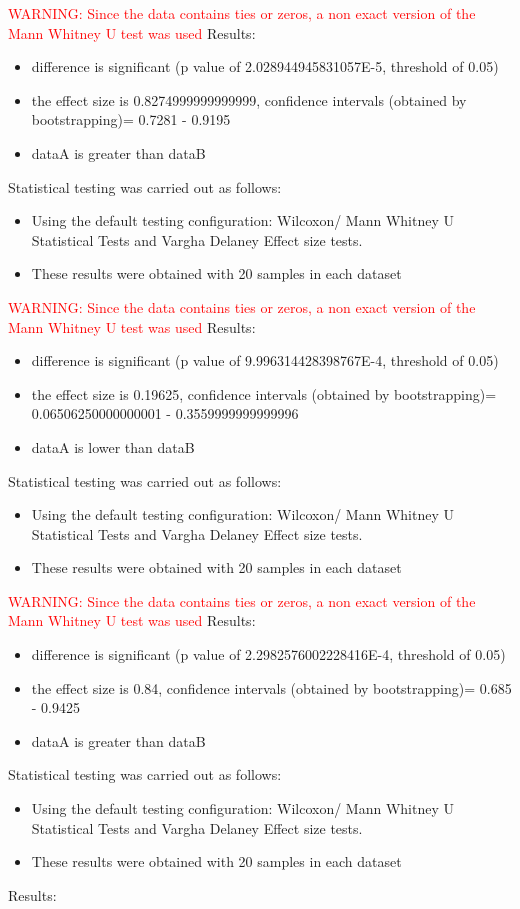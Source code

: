 \documentclass[]{article}
\begin{document}
\textcolor{Red}{WARNING: Since the data contains ties or zeros, a non exact version of the Mann Whitney U test was used
}
Results:
\begin{itemize}
\item{difference is significant (p value of 2.028944945831057E-5, threshold of 0.05)}
\item{the effect size is 0.8274999999999999, confidence intervals (obtained by bootstrapping)= 0.7281 - 0.9195}
\item{dataA is greater than dataB}
\end{itemize}Statistical testing was carried out as follows: \begin{itemize}
\item{Using the default testing configuration: Wilcoxon/ Mann Whitney U Statistical Tests and Vargha Delaney Effect size tests.}
\item{These results were obtained with 20 samples in each dataset}
\end{itemize}
\textcolor{Red}{WARNING: Since the data contains ties or zeros, a non exact version of the Mann Whitney U test was used
}
Results:
\begin{itemize}
\item{difference is significant (p value of 9.996314428398767E-4, threshold of 0.05)}
\item{the effect size is 0.19625, confidence intervals (obtained by bootstrapping)= 0.06506250000000001 - 0.3559999999999996}
\item{dataA is lower than dataB}
\end{itemize}Statistical testing was carried out as follows: \begin{itemize}
\item{Using the default testing configuration: Wilcoxon/ Mann Whitney U Statistical Tests and Vargha Delaney Effect size tests.}
\item{These results were obtained with 20 samples in each dataset}
\end{itemize}
\textcolor{Red}{WARNING: Since the data contains ties or zeros, a non exact version of the Mann Whitney U test was used
}
Results:
\begin{itemize}
\item{difference is significant (p value of 2.2982576002228416E-4, threshold of 0.05)}
\item{the effect size is 0.84, confidence intervals (obtained by bootstrapping)= 0.685 - 0.9425}
\item{dataA is greater than dataB}
\end{itemize}Statistical testing was carried out as follows: \begin{itemize}
\item{Using the default testing configuration: Wilcoxon/ Mann Whitney U Statistical Tests and Vargha Delaney Effect size tests.}
\item{These results were obtained with 20 samples in each dataset}
\end{itemize}Results:
\end{document}
